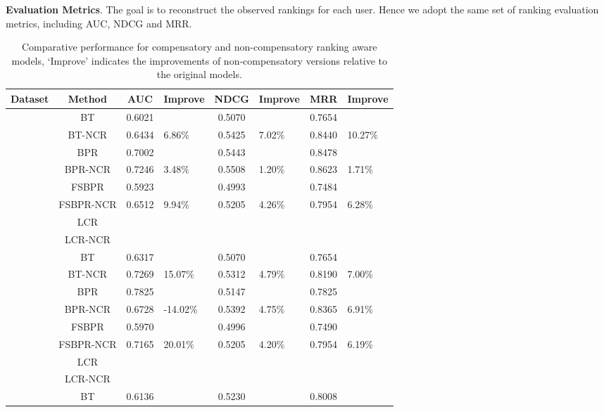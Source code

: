 \documentclass[letterpaper]{article} %
\begin{document}
\textbf{Evaluation Metrics}.  The goal is to reconstruct the observed rankings for each user. Hence we adopt the same set of ranking evaluation metrics, including AUC, NDCG and MRR. 
\begin{table}[htp]
\tiny
\caption{Comparative performance for compensatory and non-compensatory ranking aware models, `Improve' indicates the improvements of non-compensatory versions relative to the original models.}
\begin{center}
\begin{tabular}{|p{0.5cm}|c|c|p{0.8cm}|c|p{0.5cm}|c|p{0.5cm}|}
\hline
Dataset	& Method	& AUC	& Improve&	NDCG&	Improve&	MRR	&Improve\\\hline
{} 	& BT	& 0.6021 	& & 	0.5070 	& & 	0.7654 & 	\\
	& BT-NCR	& 0.6434 	& 6.86$\%$	& 0.5425 	& 7.02$\%$ &	0.8440 &	10.27$\%$\\
	& BPR	& 0.7002 		& & 0.5443 & & 		0.8478 & 	\\
	& BPR-NCR	& 0.7246 & 	3.48$\%$& 	0.5508 	& 1.20$\%$& 	0.8623 	& 1.71$\%$\\ 
	& FSBPR	& 0.5923 	& & 	0.4993 	& & 	0.7484 	& \\
	& FSBPR-NCR	& 0.6512 & 	9.94$\%$& 	0.5205 	& 4.26$\%$& 	0.7954 	& 6.28$\%$\\
	& LCR		&  & & & & & 				\\
	& LCR-NCR		&&&&&&				\\\hline
{}	& BT	& 0.6317 	& & 	0.5070 	& & 	0.7654 & \\
	& BT-NCR	& 0.7269 & 	15.07$\%$& 	0.5312 	& 4.79$\%$& 	0.8190 	& 7.00$\%$\\
	& BPR	& 0.7825 		& & 0.5147 	& & 	0.7825 & 	\\
	& BPR-NCR	& 0.6728 	& -14.02$\%$& 	0.5392 	& 4.75$\%$& 	0.8365 	& 6.91$\%$\\
	& FSBPR	& 0.5970 		& & 0.4996 	& & 	0.7490 	& \\
	& FSBPR-NCR		& 0.7165 	& 20.01$\%$	& 0.5205 	& 4.20$\%$	& 0.7954 	& 6.19$\%$\\
	& LCR		 & & & & & & 				\\
	& LCR-NCR	& & & & & & 			\\\hline		
{}	& BT	& 0.6136 	& & 	0.5230 & & 		0.8008&  	\\

\end{tabular}
\end{center}
\end{table}
\end{document}
